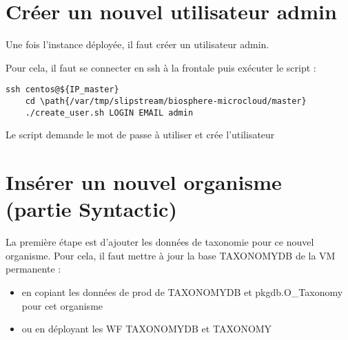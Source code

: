 \section{Créer un nouvel utilisateur admin}

Une fois l'instance déployée, il faut créer un utilisateur admin.

Pour cela, il faut se connecter en ssh à la frontale puis exécuter le script :
\begin{lstlisting}[style=Bash,gobble=4]
    ssh centos@${IP_master}
    cd \path{/var/tmp/slipstream/biosphere-microcloud/master}
    ./create_user.sh LOGIN EMAIL admin
\end{lstlisting}
Le script demande le mot de passe à utiliser et crée l'utilisateur

\section{Insérer un nouvel organisme (partie Syntactic)}

La première étape est d'ajouter les données de taxonomie pour ce nouvel organisme.
Pour cela, il faut mettre à jour la base TAXONOMYDB de la VM permanente :
\begin{itemize}
    \item en copiant les données de prod de TAXONOMYDB et pkgdb.O\_Taxonomy pour cet organisme
    \item ou en déployant les WF TAXONOMYDB et TAXONOMY
\end{itemize}

